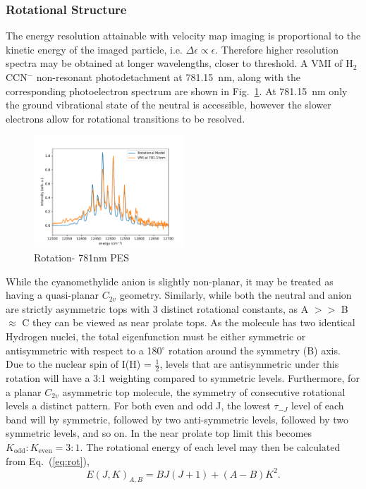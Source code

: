 \documentclass[journal=jpcafh,manuscript=article,layout=onecolumn, 12pt]{achemso}
\begin{document}
\subsubsection{Rotational Structure}
The energy resolution attainable with velocity map imaging is proportional to the kinetic energy of the imaged particle, i.e. $\Delta\epsilon\propto\epsilon$. Therefore higher resolution spectra may be obtained at longer wavelengths, closer to threshold. A VMI of H$_2$CCN$^-$ non-resonant photodetachment at 781.15~nm, along with the corresponding photoelectron spectrum are shown in Fig.~\ref{fig:781}. At 781.15~nm only the ground vibrational state of the neutral is accessible, however the slower electrons allow for rotational transitions to be resolved. 

\begin{figure}
	\includegraphics[width=0.5\textwidth]{figures/781rot.pdf}
	\caption{Rotation- 781nm PES}
	\label{fig:781}
\end{figure}

While the cyanomethylide anion is slightly non-planar, it may be treated as having a quasi-planar $C_{2v}$ geometry. Similarly, while both the neutral and anion are strictly asymmetric tops with 3 distinct rotational constants, as A $>>$ B $\approx$ C they can be viewed as near prolate tops. As the molecule has two identical Hydrogen nuclei, the total eigenfunction must be either symmetric or antisymmetric  with respect to a 180$^{\circ}$ rotation around the symmetry (B) axis. Due to the nuclear spin of I(H) = $\frac{1}{2}$, levels that are antisymmetric under this rotation will have a 3:1 weighting compared to symmetric levels. Furthermore, for a planar $C_{2v}$ asymmetric top molecule, the symmetry of consecutive rotational levels a distinct pattern. For both even and odd J, the lowest $\tau_{-J}$ level of each band will by symmetric, followed by two anti-symmetric levels, followed by two symmetric levels, and so on. In the near prolate top limit this becomes $K_{\text{odd}} : K_{\text{even}} = 3:1$. The rotational energy of each level may then be calculated from Eq.~(\ref{eq:rot}),
\begin{equation}
	E(J,K)_{A,B} = BJ(J+1)+(A-B)K^2.
	\label{eq:rot}
\end{equation}
\end{document}
